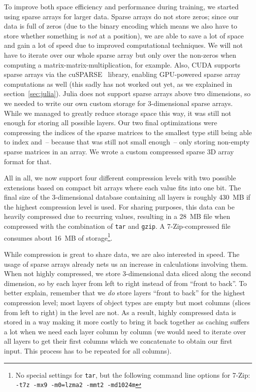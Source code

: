 To improve both space efficiency and performance during training, we
started using sparse arrays for larger data. Sparse arrays do not
store zeros; since our data is full of zeros (due to the binary
encoding which means we also have to store whether something is
\emph{not} at a position), we are able to save a lot of space and gain
a lot of speed due to improved computational techniques. We will not
have to iterate over our whole sparse array but only over the
non-zeros when computing a matrix-matrix-multiplication, for example.
Also, CUDA supports sparse arrays via the cuSPARSE~\cite{CuSPARSE2012}
library, enabling GPU-powered sparse array computations as well (this
sadly has not worked out yet, as we explained in
section~\ref{sec:julia}). Julia does not support sparse arrays above
two dimensions, so we needed to write our own custom storage for
3-dimensional sparse arrays. While we managed to greatly reduce
storage space this way, it was still not enough for storing all
possible layers. Our two final optimizations were compressing the
indices of the sparse matrices to the smallest type still being able
to index and~-- because that was still not small enough~-- only storing
non-empty sparse matrices in an array. We wrote a custom compressed
sparse 3D array format for that.

All in all, we now support four different compression levels with two
possible extensions based on compact bit arrays where each value fits
into one bit. The final size of the 3-dimensional database containing
all layers is roughly 430~MB if the highest compression level is used.
For sharing purposes, this data can be heavily compressed due to
recurring values, resulting in a 28~MB file when compressed with the
combination of \texttt{tar} and \texttt{gzip}. A 7-Zip-compressed file
consumes about 16~MB of storage\footnote{No special settings for
  \texttt{tar}, but the following command line options for 7-Zip:
  \texttt{-t7z -mx9 -m0=lzma2 -mmt2 -md1024m}}. \medskip

While compression is great to share data, we are also interested in
speed. The usage of sparse arrays already nets us an increase in
calculations involving them. When not highly compressed, we store
3-dimensional data sliced along the second dimension, so by each layer
from left to right instead of from ``front to back''. To better
explain, remember that we \emph{do} store layers ``front to back'' for
the highest compression level; most layers of object types are empty
but most columns (slices from left to right) in the level are
not. %
As a result, highly compressed data is stored in a way making it more
costly to bring it back together as caching suffers a lot when we need
each layer column by column (we would need to iterate over all layers
to get their first columns which we concatenate to obtain our first
input. This process has to be repeated for all columns).

